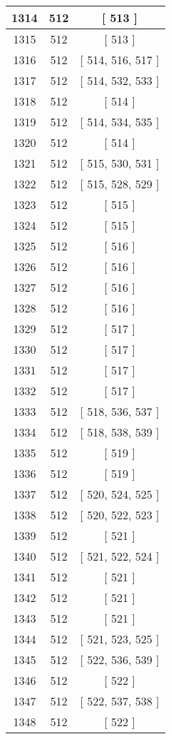 \begin{center}
\begin{longtable}[H]{|| c c c ||}
\hline
1314 & 512 & [ 513 ] \\ 
\hline
1315 & 512 & [ 513 ] \\ 
\hline
1316 & 512 & [ 514, 516, 517 ] \\ 
\hline
1317 & 512 & [ 514, 532, 533 ] \\ 
\hline
1318 & 512 & [ 514 ] \\ 
\hline
1319 & 512 & [ 514, 534, 535 ] \\ 
\hline
1320 & 512 & [ 514 ] \\ 
\hline
1321 & 512 & [ 515, 530, 531 ] \\ 
\hline
1322 & 512 & [ 515, 528, 529 ] \\ 
\hline
1323 & 512 & [ 515 ] \\ 
\hline
1324 & 512 & [ 515 ] \\ 
\hline
1325 & 512 & [ 516 ] \\ 
\hline
1326 & 512 & [ 516 ] \\ 
\hline
1327 & 512 & [ 516 ] \\ 
\hline
1328 & 512 & [ 516 ] \\ 
\hline
1329 & 512 & [ 517 ] \\ 
\hline
1330 & 512 & [ 517 ] \\ 
\hline
1331 & 512 & [ 517 ] \\ 
\hline
1332 & 512 & [ 517 ] \\ 
\hline
1333 & 512 & [ 518, 536, 537 ] \\ 
\hline
1334 & 512 & [ 518, 538, 539 ] \\ 
\hline
1335 & 512 & [ 519 ] \\ 
\hline
1336 & 512 & [ 519 ] \\ 
\hline
1337 & 512 & [ 520, 524, 525 ] \\ 
\hline
1338 & 512 & [ 520, 522, 523 ] \\ 
\hline
1339 & 512 & [ 521 ] \\ 
\hline
1340 & 512 & [ 521, 522, 524 ] \\ 
\hline
1341 & 512 & [ 521 ] \\ 
\hline
1342 & 512 & [ 521 ] \\ 
\hline
1343 & 512 & [ 521 ] \\ 
\hline
1344 & 512 & [ 521, 523, 525 ] \\ 
\hline
1345 & 512 & [ 522, 536, 539 ] \\ 
\hline
1346 & 512 & [ 522 ] \\ 
\hline
1347 & 512 & [ 522, 537, 538 ] \\ 
\hline
1348 & 512 & [ 522 ] \\ 

\end{longtable}
\end{center}
